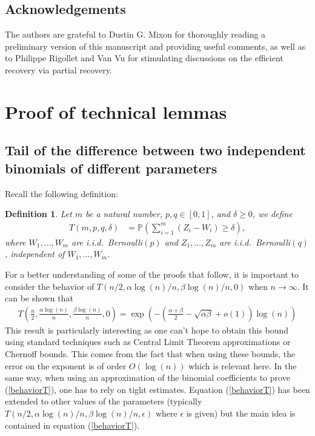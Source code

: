 \documentclass[english]{article}
\newtheorem{definition}{Definition}
\newcommand{\eps}{\varepsilon}
\newcommand{\1}{\textbf{1}}
\newcommand{\p}{\mathbb{P}}
\begin{document}
\subsection*{Acknowledgements}
The authors are grateful to Dustin G. Mixon for thoroughly reading a preliminary version of this manuscript and providing useful comments, as well as to Philippe Rigollet and Van Vu for stimulating discussions on the efficient recovery via partial recovery. 

%

\newpage



%
%


\newpage
\appendix


\section{Proof of technical lemmas}

\subsection{Tail of the difference between two independent binomials of different parameters}

Recall the following definition:
\begin{definition}\label{def:definitionofT}
Let $m$ be a natural number, $p,q\in [0,1]$, and $\delta\geq 0$, we define
\begin{align}
T(m, p, q , \delta) &= \p\left( \sum_{i=1}^m (Z_i - W_i) \geq \delta \right),
\end{align}
where $W_1,\dots, W_m$ are i.i.d.\ Bernoulli$(p)$ and $Z_1,\dots, Z_m$ are i.i.d.\ Bernoulli$(q)$, independent of $W_1,\dots, W_m$.
\end{definition}
For a better understanding of some of the proofs that follow, it is important to consider the behavior of $T \left( n/2, \alpha \log(n)/n, \beta \log(n)/n, 0 \right)$ when $n \rightarrow \infty$. It can be shown that
\begin{align}
T \left( \frac{n}{2}, \frac{\alpha \log(n)}{n}, \frac{\beta \log(n)}{n}, 0 \right) =\exp \left( - \left( \frac{\alpha + \beta}{2} -\sqrt{\alpha \beta} +o(1) \right) \log(n) \right) \label{behaviorT}
\end{align}
This result is particularly interesting as one can't hope to obtain this bound using standard techniques such as Central Limit Theorem approximations or Chernoff bounds. This comes from the fact that when using these bounds, the error on the exponent is of order $O(\log(n))$ which is relevant here. In the same way, when using an approximation of the binomial coefficients to prove (\ref{behaviorT}), one has to rely on tight estimates. Equation (\ref{behaviorT}) has been extended  to other values of the parameters (typically $T \left(n/2, \alpha \log(n)/n, \beta \log(n)/n,  \epsilon \right)$ where $\epsilon$ is given) but the main idea is contained in equation (\ref{behaviorT}).\\
\end{document}

